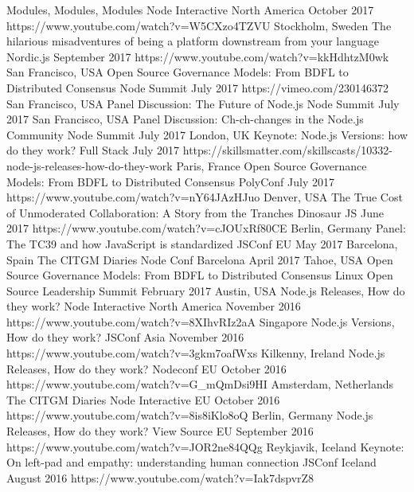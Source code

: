 \documentclass[11pt,a4paper,sans]{moderncv}   %
\begin{document}
  {Modules, Modules, Modules}
  {Node Interactive North America}
  {October 2017}{}
  {https://www.youtube.com/watch?v=W5CXzo4TZVU}
\cventry
  {Stockholm, Sweden}
  {The hilarious misadventures of being a platform downstream from your language}
  {Nordic.js}
  {September 2017}{}
  {https://www.youtube.com/watch?v=kkHdhtzM0wk}
\cventry
  {San Francisco, USA}
  {Open Source Governance Models: From BDFL to Distributed Consensus}
  {Node Summit}
  {July 2017}{}
  {https://vimeo.com/230146372}
\cventry
  {San Francisco, USA}
  {Panel Discussion: The Future of Node.js}
  {Node Summit}
  {July 2017}{}
  {}
\cventry
  {San Francisco, USA}
  {Panel Discussion: Ch-ch-changes in the Node.js Community}
  {Node Summit}
  {July 2017}{}
  {}   
\cventry
  {London, UK}
  {Keynote: Node.js Versions: how do they work?}
  {Full Stack}
  {July 2017}{}
  {https://skillsmatter.com/skillscasts/10332-node-js-releases-how-do-they-work}
\cventry
  {Paris, France}
  {Open Source Governance Models: From BDFL to Distributed Consensus}
  {PolyConf}
  {July 2017}{}
  {https://www.youtube.com/watch?v=nY64JAzHJuo}
\cventry
  {Denver, USA}
  {The True Cost of Unmoderated Collaboration: A Story from the Tranches}
  {Dinosaur JS}
  {June 2017}{}
  {https://www.youtube.com/watch?v=cJOUxRf80CE}
\cventry
  {Berlin, Germany}
  {Panel: The TC39 and how JavaScript is standardized}
  {JSConf EU}
  {May 2017}{}
  {}
\cventry
  {Barcelona, Spain}
  {The CITGM Diaries}
  {Node Conf Barcelona}
  {April 2017}{}
  {}
\cventry
  {Tahoe, USA}
  {Open Source Governance Models: From BDFL to Distributed Consensus}
  {Linux Open Source Leadership Summit}
  {February 2017}{}
  {}
\cventry
  {Austin, USA}
  {Node.js Releases, How do they work?}
  {Node Interactive North America}
  {November 2016}{}
  {https://www.youtube.com/watch?v=8XIhvRIz2aA}
\cventry
  {Singapore}
  {Node.js Versions, How do they work?}
  {JSConf Asia}
  {November 2016}{}
  {https://www.youtube.com/watch?v=3gkm7oafWxs}
\cventry
  {Kilkenny, Ireland}
  {Node.js Releases, How do they work?}
  {Nodeconf EU}
  {October 2016}{}
  {https://www.youtube.com/watch?v=G\_mQmDsi9HI}
\cventry
  {Amsterdam, Netherlands}
  {The CITGM Diaries}
  {Node Interactive EU}
  {October 2016}{}
  {https://www.youtube.com/watch?v=8is8iKlo8oQ}
\cventry
  {Berlin, Germany}
  {Node.js Releases, How do they work?}
  {View Source EU}
  {September 2016}{}
  {https://www.youtube.com/watch?v=JOR2ne84QQg}
\cventry
  {Reykjavik, Iceland}
  {Keynote:  On left-pad and empathy: understanding human connection}
  {JSConf Iceland}
  {August 2016}{}
  {https://www.youtube.com/watch?v=Iak7dspvrZ8}
\end{document}
